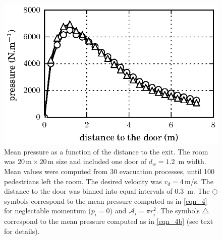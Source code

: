 \begin{figure}[!htbp]
\includegraphics[width=\columnwidth]{./fig16.eps}
\caption{\label{fig:10} Mean pressure as a function of the distance 
to the exit. The room was $20\,\mathrm{m}\times20\,\mathrm{m}$ size and 
included one door of $d_w=1.2$~m width. Mean values were computed from 30 
evacuation processes, until 100 pedestrians left the room. The desired velocity 
was $v_d=4\,$m/s. The distance to the door was binned into equal intervals of 
$0.3$~m.  The $\bigcirc$  symbols correspond to the mean pressure computed as 
in \ref{eqn_4} for neglectable momentum ($p_i=0$) and $\mathcal{A}_i=\pi 
r_i^2$. The symbols $\bigtriangleup$ correspond to the mean pressure computed as 
in \ref{eqn_4b} (see text for details).  }
\end{figure}

